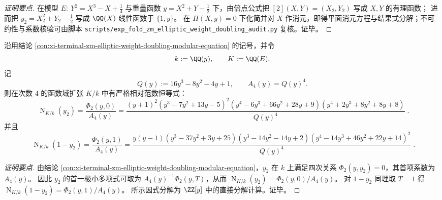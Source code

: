 \begin{proof}[证明要点]
在模型 \(E:\ Y^{2}=X^{3}-X+\tfrac14\) 与重量函数 \(y=X^{2}+Y-\tfrac12\) 下，由倍点公式把 \([2](X,Y)=(X_{2},Y_{2})\) 写成 \(X,Y\) 的有理函数；
进而把 \(y_{2}=X_{2}^{2}+Y_{2}-\tfrac12\) 写成 \(\QQ(X)\)-线性函数于 \(\{1,y\}\)。
在 \(\Pi(X,y)=0\) 下化简并对 \(X\) 作消元，即得平面消元方程与结果式分解；不可约性与系数核验可由脚本 \texttt{scripts/exp\_fold\_zm\_elliptic\_weight\_doubling\_audit.py} 复核。证毕。
\end{proof}

\begin{conclusion}\label{con:xi-terminal-zm-elliptic-weight-doubling-norms-0-1}
沿用结论 \ref{con:xi-terminal-zm-elliptic-weight-doubling-modular-equation} 的记号，并令
\[
k:=\QQ(y),\qquad K:=\QQ(E).
\]
记
\[
Q(y):=16y^{3}-8y^{2}-4y+1,
\qquad
A_{4}(y)=Q(y)^{4}.
\]
则在次数 \(4\) 的函数域扩张 \(K/k\) 中有严格相对范数恒等式：
\[
\boxed{\;
\operatorname{N}_{K/k}(y_{2})
=\frac{\Phi_{2}(y,0)}{A_{4}(y)}
=\frac{(y+1)^{2}(y^{3}-7y^{2}+13y-5)^{2}(y^{4}-6y^{3}+66y^{2}+28y+9)(y^{4}+2y^{3}+8y^{2}+8y+8)}{Q(y)^{4}}\; }.
\]
并且
\[
\boxed{\;
\operatorname{N}_{K/k}(1-y_{2})
=\frac{\Phi_{2}(y,1)}{A_{4}(y)}
=\frac{y(y-1)(y^{3}-37y^{2}+3y+25)(y^{3}-14y^{2}-14y+2)(y^{4}-14y^{3}+46y^{2}+22y+14)^{2}}{Q(y)^{4}}\; }.
\]
\end{conclusion}
\begin{proof}[证明要点]
由结论 \ref{con:xi-terminal-zm-elliptic-weight-doubling-modular-equation}，\(y_{2}\) 在 \(k\) 上满足四次关系 \(\Phi_{2}(y,y_{2})=0\)，其首项系数为 \(A_{4}(y)\)。
因此 \(y_{2}\) 的首一极小多项式可取为 \(A_{4}(y)^{-1}\Phi_{2}(y,T)\)，从而 \(\operatorname{N}_{K/k}(y_{2})=\Phi_{2}(y,0)/A_{4}(y)\)。
对 \(1-y_{2}\) 同理取 \(T=1\) 得 \(\operatorname{N}_{K/k}(1-y_{2})=\Phi_{2}(y,1)/A_{4}(y)\)。
所示因式分解为 \(\ZZ[y]\) 中的直接分解计算。证毕。
\end{proof}

